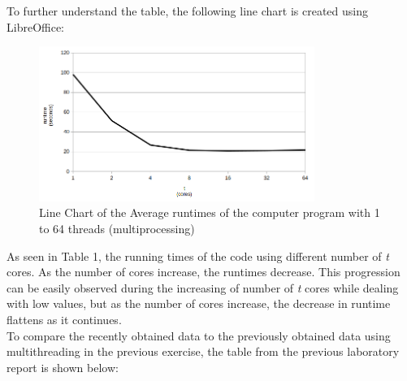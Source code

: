 \documentclass{article}
\begin{document}
\indent To further understand the table, the following line chart is created using LibreOffice:
\begin{figure}[H]
    \includegraphics[width=0.8\textwidth]{chart01.png}
    \centering
    \caption{Line Chart of the Average runtimes of the computer program with 1 to 64 threads (multiprocessing)}
    \end{figure}


\indent As seen in Table 1, the running times of the code using different number of \emph{t} cores. As the number of cores increase, the runtimes decrease. This progression can be easily observed during the increasing of number of \emph{t} cores while dealing with low values, but as the number of cores increase, the decrease in runtime flattens as it continues.\\
\indent To compare the recently obtained data to the previously obtained data using multithreading in the previous exercise, the table from the previous laboratory report is shown below:
\end{document}
